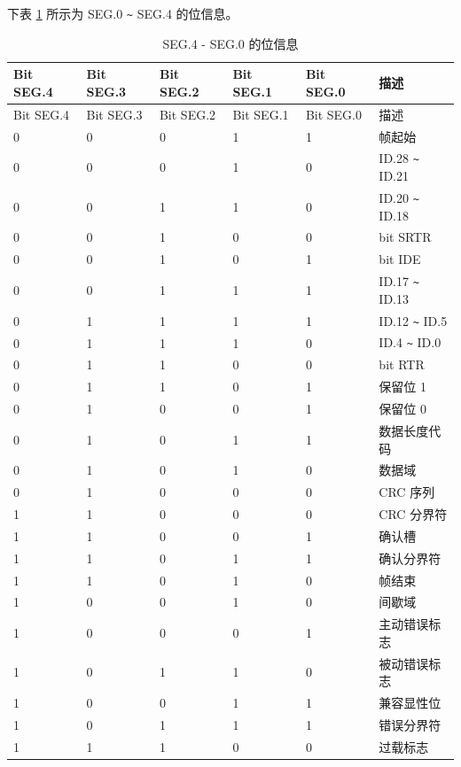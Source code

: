 \documentclass[main\_\_CN.tex]{subfiles}
\begin{document}
下表 \ref{table:Bit_information} 所示为 SEG.0 \verb+~+ SEG.4 的位信息。

\begin{longtable}[c]{|p{2cm}<{\centering}|p{2cm}<{\centering}|p{2cm}<{\centering}|p{2cm}<{\centering}|p{2cm}<{\centering}|p{4cm}|}
    \caption{SEG.4 - SEG.0 的位信息}
    \label{table:Bit_information}\\
    \hline
    \rowcolor{lightgray}
   Bit SEG.4 & Bit SEG.3 & Bit SEG.2 & Bit SEG.1 & Bit SEG.0 & 描述
   \\\hline
   \endfirsthead

   \hline
   \rowcolor{lightgray}
   Bit SEG.4 & Bit SEG.3 & Bit SEG.2 & Bit SEG.1 & Bit SEG.0 & 描述
   \\\hline
   \endhead
   \endfoot
   \hline
   \endlastfoot

    0 & 0 & 0 & 1 & 1 & 帧起始
    \\\hline
    0 & 0 & 0 & 1 & 0 & ID.28 \verb+~+ ID.21
    \\\hline
    0 & 0 & 1 & 1 & 0 & ID.20 \verb+~+ ID.18
    \\\hline
    0 & 0 & 1 & 0 & 0 & bit SRTR
    \\\hline
    0 & 0 & 1 & 0 & 1 & bit IDE
    \\\hline
    0 & 0 & 1 & 1 & 1 & ID.17 \verb+~+ ID.13
    \\\hline
    0 & 1 & 1 & 1 & 1 & ID.12 \verb+~+ ID.5
    \\\hline
    0 & 1 & 1 & 1 & 0 & ID.4 \verb+~+ ID.0
    \\\hline
    0 & 1 & 1 & 0 & 0 & bit RTR
    \\\hline
    0 & 1 & 1 & 0 & 1 & 保留位 1
    \\\hline
    0 & 1 & 0 & 0 & 1 & 保留位 0
    \\\hline
    0 & 1 & 0 & 1 & 1 & 数据长度代码
    \\\hline
    0 & 1 & 0 & 1 & 0 & 数据域
    \\\hline
    0 & 1 & 0 & 0 & 0 & CRC 序列
    \\\hline
    1 & 1 & 0 & 0 & 0 & CRC 分界符
    \\\hline
    1 & 1 & 0 & 0 & 1 & 确认槽
    \\\hline
    1 & 1 & 0 & 1 & 1 & 确认分界符
    \\\hline
    1 & 1 & 0 & 1 & 0 & 帧结束
    \\\hline
    1 & 0 & 0 & 1 & 0 & 间歇域
    \\\hline
    1 & 0 & 0 & 0 & 1 & 主动错误标志
    \\\hline
    1 & 0 & 1 & 1 & 0 & 被动错误标志
    \\\hline
    1 & 0 & 0 & 1 & 1 & 兼容显性位
    \\\hline
    1 & 0 & 1 & 1 & 1 & 错误分界符
    \\\hline
    1 & 1 & 1 & 0 & 0 & 过载标志
    \\\hline
\end{longtable}
\end{document}
